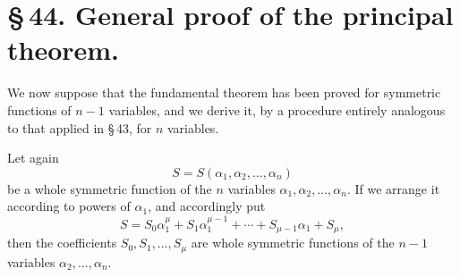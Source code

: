 \documentclass[11pt]{article}
\begin{document}
\section*{\S\,44. General proof of the principal theorem.}

We now suppose that the fundamental theorem has been proved for symmetric functions of \(n-1\) variables, and we derive it, by a procedure entirely analogous to that applied in \S\,43, for \(n\) variables.

Let again
\begin{equation}
 S=S(\alpha_1,\alpha_2,\ldots,\alpha_n)
\tag{1}
\end{equation}
be a whole symmetric function of the \(n\) variables \(\alpha_1,\alpha_2,\ldots,\alpha_n\). If we arrange it according to powers of \(\alpha_1\), and accordingly put
\begin{equation}
 S=S_0\alpha_1^\mu+S_1\alpha_1^{\mu-1}+\cdots+S_{\mu-1}\alpha_1+S_\mu,
\tag{2}
\end{equation}
then the coefficients \(S_0,S_1,\ldots,S_\mu\) are whole symmetric functions of the \(n-1\) variables \(\alpha_2,\ldots,\alpha_n\).
\end{document}
